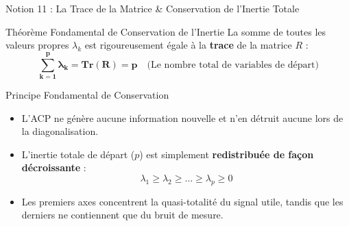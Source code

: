 \documentclass[aspectratio=169,10pt]{beamer}
\begin{document}
\begin{frame}{Notion 11 : La Trace de la Matrice \& Conservation de l'Inertie Totale}
  \begin{conceptbox}{Théorème Fondamental de Conservation de l'Inertie}
    \footnotesize
    La somme de toutes les valeurs propres $\lambda_k$ est rigoureusement égale à la \textbf{trace} de la matrice $R$ :
    \begin{equation*}
      \mathbf{\sum_{k=1}^p \lambda_k = \text{Tr}(R) = p} \quad \text{(Le nombre total de variables de départ)}
    \end{equation*}
  \end{conceptbox}
  \vspace{1mm}
  \begin{takeawaybox}{Principe Fondamental de Conservation}
    \footnotesize
    \begin{itemize}
      \item L'ACP ne génère aucune information nouvelle et n'en détruit aucune lors de la diagonalisation.
      \item L'inertie totale de départ ($p$) est simplement \textbf{redistribuée de façon décroissante} :
      \begin{equation*}
        \lambda_1 \ge \lambda_2 \ge \dots \ge \lambda_p \ge 0
      \end{equation*}
      \item Les premiers axes concentrent la quasi-totalité du signal utile, tandis que les derniers ne contiennent que du bruit de mesure.
    \end{itemize}
  \end{takeawaybox}
\end{frame}
\end{document}
